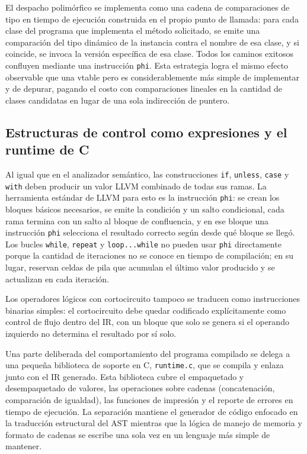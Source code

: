 \documentclass[11pt,a4paper]{article}
\begin{document}
El despacho polimórfico se implementa como una cadena de comparaciones de tipo en tiempo de ejecución construida en el propio punto de llamada: para cada clase del programa que implementa el método solicitado, se emite una comparación del tipo dinámico de la instancia contra el nombre de esa clase, y si coincide, se invoca la versión específica de esa clase. Todos los caminos exitosos confluyen mediante una instrucción \texttt{phi}. Esta estrategia logra el mismo efecto observable que una vtable pero es considerablemente más simple de implementar y de depurar, pagando el costo con comparaciones lineales en la cantidad de clases candidatas en lugar de una sola indirección de puntero.

\subsection{Estructuras de control como expresiones y el runtime de C}

Al igual que en el analizador semántico, las construcciones \texttt{if}, \texttt{unless}, \texttt{case} y \texttt{with} deben producir un valor LLVM combinado de todas sus ramas. La herramienta estándar de LLVM para esto es la instrucción \texttt{phi}: se crean los bloques básicos necesarios, se emite la condición y un salto condicional, cada rama termina con un salto al bloque de confluencia, y en ese bloque una instrucción \texttt{phi} selecciona el resultado correcto según desde qué bloque se llegó. Los bucles \texttt{while}, \texttt{repeat} y \texttt{loop...while} no pueden usar \texttt{phi} directamente porque la cantidad de iteraciones no se conoce en tiempo de compilación; en su lugar, reservan celdas de pila que acumulan el último valor producido y se actualizan en cada iteración.

Los operadores lógicos con cortocircuito tampoco se traducen como instrucciones binarias simples: el cortocircuito debe quedar codificado explícitamente como control de flujo dentro del IR, con un bloque que solo se genera si el operando izquierdo no determina el resultado por sí solo.

Una parte deliberada del comportamiento del programa compilado se delega a una pequeña biblioteca de soporte en C, \texttt{runtime.c}, que se compila y enlaza junto con el IR generado. Esta biblioteca cubre el empaquetado y desempaquetado de valores, las operaciones sobre cadenas (concatenación, comparación de igualdad), las funciones de impresión y el reporte de errores en tiempo de ejecución. La separación mantiene el generador de código enfocado en la traducción estructural del AST mientras que la lógica de manejo de memoria y formato de cadenas se escribe una sola vez en un lenguaje más simple de mantener.
\end{document}
